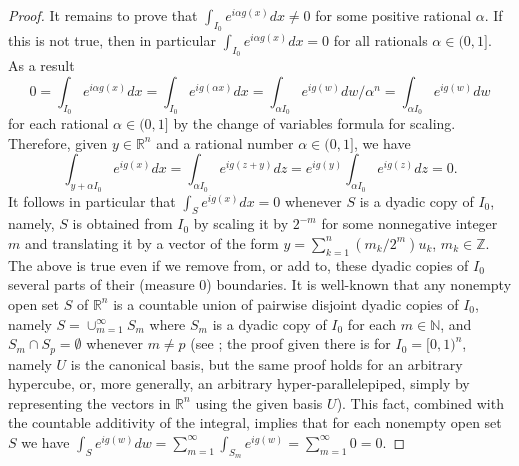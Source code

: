 \documentclass[12 pt]{amsart}
\theoremstyle{definition}
\newcommand{\R}{\mathbb{R}}
\newcommand{\N}{\mathbb{N}}
\newcommand{\Z}{\mathbb{Z}}
\begin{document}
\begin{proof}
 It remains to prove that $\int_{I_0} e^{i\alpha g(x)}dx\neq 0$ for some positive rational $\alpha$.  If this is not true, 
 then in particular $\int_{I_0} e^{i \alpha g(x)}dx=0$ for all rationals $\alpha\in (0,1]$.  As a result  
\begin{equation*}%
0=\int_{I_0}e^{i\alpha g(x)}dx=\int_{I_0}e^{i g(\alpha x)}dx=\int_{\alpha I_0} e^{i g(w)}dw/\alpha^n=\int_{\alpha I_0} e^{i g(w)}dw
\end{equation*} 
for each  rational $\alpha\in (0,1]$ by  the change of variables formula for scaling. 
 Therefore, given $y\in\R^n$ and a rational number $\alpha\in (0,1]$, we have 
\begin{equation*}
\int_{y+\alpha I_0}e^{i g(x)}dx=\int_{\alpha I_0}e^{i g(z+y)}dz=e^{ig(y)}\int_{\alpha I_0}e^{i g(z)}dz=0. 
\end{equation*}
It follows in particular that $\int_{S}e^{i g(x)}dx=0$ whenever $S$ is a dyadic copy of $I_0$, namely, $S$ is obtained 
from $I_0$ by scaling it by $2^{-m}$ for some nonnegative integer $m$ and translating it by a vector of 
the form $y=\sum_{k=1}^n (m_k/2^{m})u_k$, $m_k\in \Z$. The above is true even if we remove from, or add to,  
these dyadic copies of $I_0$ several parts of their (measure 0) boundaries. It is well-known that any nonempty open set $S$ of $\R^n$  is a countable union of pairwise disjoint dyadic copies of $I_0$, namely $S=\cup_{m=1}^{\infty}S_m$ where $S_m$ is a dyadic copy of $I_0$ for each $m\in\N$, and $S_m\cap S_p=\emptyset$ whenever $m\neq p$ (see \cite[p. 50]{Rudin1987book}; the proof given there is for $I_0=[0,1)^n$, namely $U$ is the canonical basis, but the same proof holds for an arbitrary hypercube, or, more generally, an arbitrary hyper-parallelepiped, simply by representing the vectors in $\R^n$ using the given basis $U$). This fact, combined with the  countable additivity of the integral, implies that for each nonempty open set $S$ we have 
$\int_S e^{ig(w)}dw=\sum_{m=1}^{\infty}\int_{S_m}e^{ig(w)}=\sum_{m=1}^{\infty}0=0$. 


\end{proof}
\end{document}
